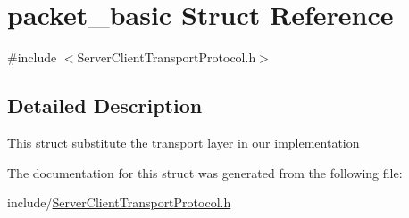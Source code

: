 \hypertarget{structpacket__basic}{}\section{packet\+\_\+basic Struct Reference}
\label{structpacket__basic}


{\ttfamily \#include $<$Server\+Client\+Transport\+Protocol.\+h$>$}



\subsection{Detailed Description}
This struct substitute the transport layer in our implementation 

The documentation for this struct was generated from the following file\+:\begin{DoxyCompactItemize}
\item 
include/\hyperlink{_server_client_transport_protocol_8h}{Server\+Client\+Transport\+Protocol.\+h}\end{DoxyCompactItemize}
